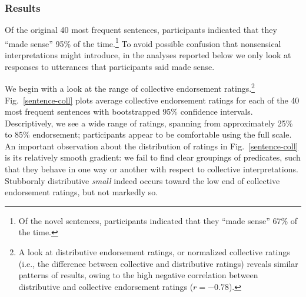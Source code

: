 \documentclass[preprint,12pt,authoryear,titlepage]{elsarticle}
\newcommand{\ndg}[1]{\textcolor{Green}{[ndg: #1]}}
\begin{document}
%

\subsubsection{Results}

Of the original 40 most frequent sentences, participants indicated that they ``made sense'' 95\% of the time.\footnote{Of the novel sentences, participants indicated that they ``made sense'' 67\% of the time.}
To avoid possible confusion that nonsensical interpretations might introduce, in the analyses reported below we only look at responses to utterances that participants said made sense. %

We begin with a look at the range of collective endorsement ratings.\footnote{A look at distributive endorsement ratings, or normalized collective ratings (i.e., the difference between collective and distributive ratings) reveals similar patterns of results, owing to the high negative correlation between distributive and collective endorsement ratings ($r=-0.78$).} Fig.~\ref{sentence-coll} plots average collective endorsement ratings for each of the 40 most frequent sentences with bootstrapped 95\% confidence intervals. Descriptively, we see a wide range of ratings, spanning from approximately 25\%  to 85\% endorsement; participants appear to be comfortable using the full scale. An important observation about the distribution of ratings in Fig.~\ref{sentence-coll} is its relatively smooth gradient: we fail to find clear groupings of predicates, such that they behave in one way or another with respect to collective interpretations. Stubbornly distributive \emph{small} indeed occurs toward the low end of collective endorsement ratings, but not markedly so.
\end{document}
